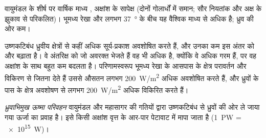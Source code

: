 \begin{omfigure}

{\small वायुमंडल के शीर्ष पर वार्षिक माध्य , अक्षांश के सापेक्ष
(दोनों गोलार्धों में समान; सौर नियतांक और अक्ष के झुकाव से परिकलित)। भूमध्य
रेखा और लगभग \qty{37}{\degree} के बीच यह वैश्विक माध्य से अधिक है; ध्रुव की ओर कम।}
\end{omfigure}

उष्णकटिबंध ध्रुवीय क्षेत्रों से कहीं अधिक सूर्य-प्रकाश अवशोषित करते हैं, और उनका कम
 इस अंतर को और बढ़ाता है। वे अंतरिक्ष को जो अवरक्त भेजते हैं वह भी अधिक है,
क्योंकि वे अधिक गरम हैं, पर वह अक्षांश के साथ बहुत कम बदलता है। परिणामस्वरूप
भूमध्य रेखा के आसपास के क्षेत्र परावर्तन और विकिरण से जितना देते हैं उससे औसतन लगभग
\qty{200}{W/m^2} अधिक अवशोषित करते हैं, और ध्रुवों के पास के क्षेत्र अवशोषण से लगभग
\qty{200}{W/m^2} अधिक विकिरित करते हैं।

\begin{definition}[ध्रुवाभिमुख ऊष्मा परिवहन]\label{def:g10:earth-energy-budget:heat-transport}
\emph{ध्रुवाभिमुख ऊष्मा परिवहन} वायुमंडल और महासागर की
गतियों द्वारा उष्णकटिबंध से ध्रुवों की ओर ले जाया गया ऊर्जा का प्रवाह है। इसे किसी
अक्षांश वृत्त के आर-पार पेटावाट में मापा जाता है (\qty{1}{PW} = \qty{e15}{W})।
\end{definition}

